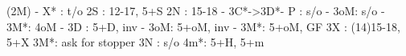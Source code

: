 (2M) - 
X* : t/o
2S : 12-17, 5+S
2N : 15-18
   - 3C*->3D*- P  : s/o
             - 3oM: s/o
             - 3M*: 4oM
   - 3D : 5+D, inv
   - 3oM: 5+oM, inv
   - 3M*: 5+oM, GF
3X : (14)15-18, 5+X
3M*: ask for stopper
3N : s/o
4m*: 5+H, 5+m
